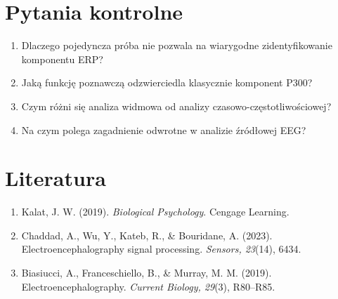 \documentclass[11pt,a4paper]{article}
\begin{document}
\section{Pytania kontrolne}
\begin{enumerate}[nosep]
  \item Dlaczego pojedyncza próba nie pozwala na wiarygodne zidentyfikowanie komponentu ERP?
  \item Jaką funkcję poznawczą odzwierciedla klasycznie komponent P300?
  \item Czym różni się analiza widmowa od analizy czasowo-częstotliwościowej?
  \item Na czym polega zagadnienie odwrotne w analizie źródłowej EEG?
\end{enumerate}

\section{Literatura}
\begin{enumerate}[nosep]
  \item Kalat, J. W. (2019). \emph{Biological Psychology}. Cengage Learning.
  \item Chaddad, A., Wu, Y., Kateb, R., \& Bouridane, A. (2023). Electroencephalography signal processing. \emph{Sensors, 23}(14), 6434.
  \item Biasiucci, A., Franceschiello, B., \& Murray, M. M. (2019). Electroencephalography. \emph{Current Biology, 29}(3), R80--R85.
\end{enumerate}
\end{document}
